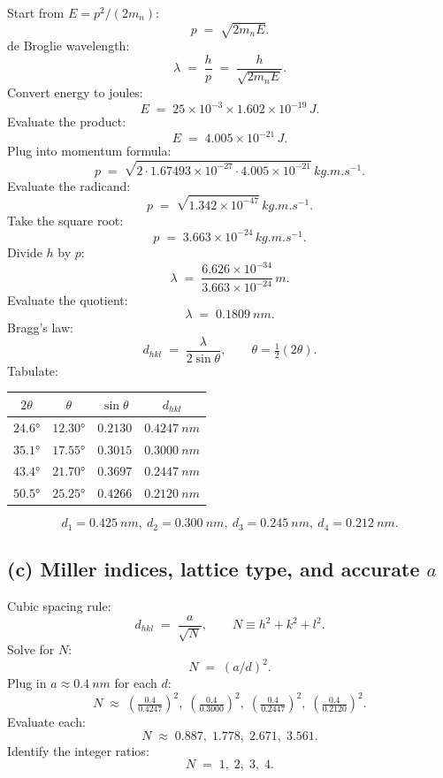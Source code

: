 \documentclass[11pt]{article}
\begin{document}
Start from $E=p^2/(2m_n)$:
\[
p \;=\; \sqrt{2 m_n E}.
\]
de Broglie wavelength:
\[
\lambda \;=\; \frac{h}{p} \;=\; \frac{h}{\sqrt{2 m_n E}}.
\]
Convert energy to joules:
\[
E \;=\; 25\times 10^{-3}\times 1.602\times 10^{-19}\,\si{J}.
\]
Evaluate the product:
\[
E \;=\; 4.005\times 10^{-21}\,\si{J}.
\]
Plug into momentum formula:
\[
p \;=\; \sqrt{2\cdot 1.67493\times 10^{-27}\cdot 4.005\times 10^{-21}}\,\si{kg.m.s^{-1}}.
\]
Evaluate the radicand:
\[
p \;=\; \sqrt{1.342\times 10^{-47}}\,\si{kg.m.s^{-1}}.
\]
Take the square root:
\[
p \;=\; 3.663\times 10^{-24}\,\si{kg.m.s^{-1}}.
\]
Divide $h$ by $p$:
\[
\lambda \;=\; \frac{6.626\times 10^{-34}}{3.663\times 10^{-24}}\,\si{m}.
\]
Evaluate the quotient:
\[
\lambda \;=\; \SI{0.1809}{nm}.
\]
Bragg's law:
\begin{equation}
d_{hkl} \;=\; \frac{\lambda}{2\sin\theta},\qquad \theta=\tfrac{1}{2}(2\theta).
\label{eq:bragg}
\end{equation}
Tabulate:
\begin{center}
\begin{tabular}{cccc}
\toprule
$2\theta$ & $\theta$ & $\sin\theta$ & $d_{hkl}$ \\
\midrule
$\ang{24.6}$ & $\ang{12.30}$ & $0.2130$ & $\SI{0.4247}{nm}$ \\
$\ang{35.1}$ & $\ang{17.55}$ & $0.3015$ & $\SI{0.3000}{nm}$ \\
$\ang{43.4}$ & $\ang{21.70}$ & $0.3697$ & $\SI{0.2447}{nm}$ \\
$\ang{50.5}$ & $\ang{25.25}$ & $0.4266$ & $\SI{0.2120}{nm}$ \\
\bottomrule
\end{tabular}
\end{center}
\begin{equation}
\boxed{\;d_1{=}\SI{0.425}{nm},\ d_2{=}\SI{0.300}{nm},\ d_3{=}\SI{0.245}{nm},\ d_4{=}\SI{0.212}{nm}.\;}
\label{eq:dvals}
\end{equation}

\subsection*{(c) Miller indices, lattice type, and accurate $a$}

Cubic spacing rule:
\begin{equation}
d_{hkl} \;=\; \frac{a}{\sqrt{N}},\qquad N\equiv h^2+k^2+l^2.
\label{eq:dN}
\end{equation}
Solve for $N$:
\[
N \;=\; (a/d)^2.
\]
Plug in $a\approx\SI{0.4}{nm}$ for each $d$:
\[
N \;\approx\; \left(\tfrac{0.4}{0.4247}\right)^2,\;\left(\tfrac{0.4}{0.3000}\right)^2,\;\left(\tfrac{0.4}{0.2447}\right)^2,\;\left(\tfrac{0.4}{0.2120}\right)^2.
\]
Evaluate each:
\[
N \;\approx\; 0.887,\;1.778,\;2.671,\;3.561.
\]
Identify the integer ratios:
\[
N \;=\; 1,\;2,\;3,\;4.
\]
\end{document}
